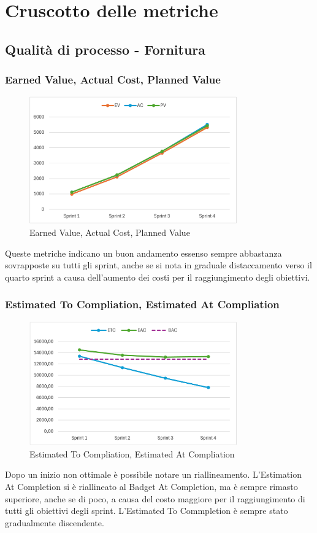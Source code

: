 \section{Cruscotto delle metriche}
\subsection{Qualità di processo - Fornitura}
\subsubsection{Earned Value, Actual Cost, Planned Value}
\begin{figure}[H]
    \centering
    \includegraphics[width=0.8\textwidth]{./images/EV-AC-PV.png}
    \caption{Earned Value, Actual Cost, Planned Value}
\end{figure}
Queste metriche indicano un buon andamento essenso sempre abbastanza sovrapposte su tutti gli sprint, anche se si nota in graduale distaccamento verso il quarto sprint a causa dell'aumento dei costi per il raggiungimento degli obiettivi.

\subsubsection{Estimated To Compliation, Estimated At Compliation}
\begin{figure}[H]
    \centering
    \includegraphics[width=0.8\textwidth]{./images/ETC-EAC.png}
    \caption{Estimated To Compliation, Estimated At Compliation}
\end{figure}
Dopo un inizio non ottimale è possibile notare un riallineamento. L'Estimation At Completion si è riallineato al Badget At Completion, ma è sempre rimasto superiore, anche se di poco, a causa del costo maggiore per il raggiungimento di tutti gli obiettivi degli sprint. L'Estimated To Commpletion è sempre stato gradualmente discendente.
